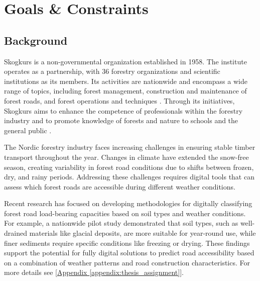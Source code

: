 \section{Goals \& Constraints}

\subsection{Background}
Skogkurs is a non-governmental organization established in 1958. The institute operates as a partnership, with 36 forestry organizations and scientific institutions as its members. Its activities are nationwide and encompass a wide range of topics, including forest management, construction and maintenance of forest roads, and forest operations and techniques \cite{skogkurs_eng}. Through its initiatives, Skogkurs aims to enhance the competence of professionals within the forestry industry and to promote knowledge of forests and nature to schools and the general public \cite{skogkurs_nor}. 

The Nordic forestry industry faces increasing challenges in ensuring stable timber transport throughout the year. Changes in climate have extended the snow-free season, creating variability in forest road conditions due to shifts between frozen, dry, and rainy periods. Addressing these challenges requires digital tools that can assess which forest roads are accessible during different weather conditions.

Recent research has focused on developing methodologies for digitally classifying forest road load-bearing capacities based on soil types and weather conditions. For example, a nationwide pilot study demonstrated that soil types, such as well-drained materials like glacial deposits, are more suitable for year-round use, while finer sediments require specific conditions like freezing or drying. These findings support the potential for fully digital solutions to predict road accessibility based on a combination of weather patterns and road construction characteristics. For more details see [\hyperref[appendix:thesis_assignment]{Appendix \ref*{appendix:thesis_assignment}}].

\begin{comment}
    Additionally, tools like HarvesterSeasons.com, developed by the Finnish Meteorological Institute, provide weekly forecasts of road conditions based on soil moisture, temperature, and snow depth. These forecasts use data from sources like NASA's SMAP and ESA's Sentinel-1 satellites to generate relative load-bearing predictions for winter and snow-free seasons. Such advancements aim to increase efficiency and reduce risks in forest operations under variable weather conditions [\ref{appendix:thesis_proposal}.
\end{comment}

